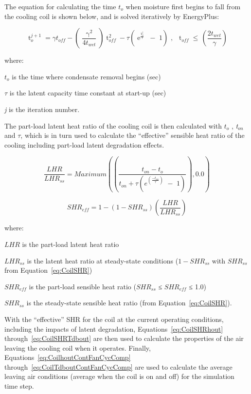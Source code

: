The equation for calculating the time \(t_{o}\) when moisture first begins to fall from the cooling coil is shown below, and is solved iteratively by EnergyPlus:

\begin{equation}
\mathop t\nolimits_o^{j + 1}  = \gamma {t_{off}} - \left( {\frac{{\mathop \gamma \nolimits^2 }}{{4{t_{wet}}}}} \right)\mathop t\nolimits_{off}^2  - \tau \left( {\mathop e\nolimits^{\frac{{\mathop t\nolimits_o^j }}{\tau }} \,\, - \,\,1} \right)\,\,,\,\,\,\mathop t\nolimits_{off}^{}  \le \,\left( {\frac{{2{t_{wet}}}}{\gamma }} \right)
\end{equation}

where:

\({t_o}\) is the time where condensate removal begins (sec)

\(\tau\) is the latent capacity time constant at start-up (sec)

\emph{j} is the iteration number.

The part-load latent heat ratio of the cooling coil is then calculated with \(t_o\) , \emph{t\(_{on}\)} and \(\tau\), which is in turn used to calculate the ``effective'' sensible heat ratio of the cooling including part-load latent degradation effects.

\begin{equation}
\frac{{LHR}}{{LH{R_{ss}}}} = Maximum\left( {\left( {\frac{{{t_{on}} - {t_o}}}{{{t_{on}} + \tau \left( {{e^{\left( {\frac{{ - {t_{on}}}}{\tau }} \right)}}\,\, - \,\,1} \right)}}} \right),0.0} \right)
\end{equation}

\begin{equation}
SH{R_{eff}} = 1 - \left( {1 - SH{R_{ss}}} \right)\left( {\frac{{LHR}}{{LH{R_{ss}}}}} \right)
\end{equation}

where:

\(LHR\) is the part-load latent heat ratio

\(LH{R_{ss}}\) is the latent heat ratio at steady-state conditions (\(1 - SH{R_{ss}}\) with \(SH{R_{ss}}\) from Equation~\ref{eq:CoilSHR})

\(SH{R_{eff}}\) is the part-load sensible heat ratio (\(SH{R_{ss}}\) ≤ \(SH{R_{eff}}\) ≤ 1.0)

\(SH{R_{ss}}\) is the steady-state sensible heat ratio (from Equation~\ref{eq:CoilSHR}).

With the ``effective'' SHR for the coil at the current operating conditions, including the impacts of latent degradation, Equations~\ref{eq:CoilSHRhout} through~\ref{eq:CoilSHRTdbout} are then used to calculate the properties of the air leaving the cooling coil when it operates. Finally, Equations~\ref{eq:CoilhoutContFanCycComp} through~\ref{eq:CoilTdboutContFanCycComp} are used to calculate the average leaving air conditions (average when the coil is on and off) for the simulation time step.

